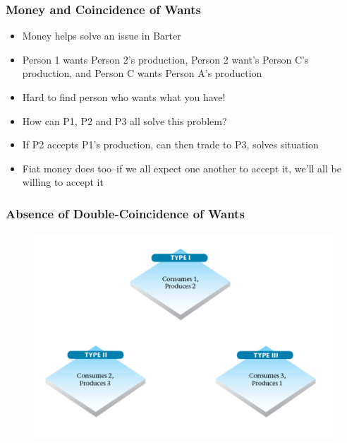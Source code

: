 \documentclass{beamer}
\begin{document}
\begin{frame}
\frametitle[alignment=center]{Money and Coincidence of Wants}
\begin{itemize}
\item Money helps solve an issue in Barter
\bigskip
\item Person 1 wants Person 2's production, Person 2 want's Person C's production, and Person C wants Person A's production
\bigskip
\item Hard to find person who wants what you have!
\bigskip
\item How can P1, P2 and P3 all solve this problem?
\bigskip
\item If P2 accepts P1's production, can then trade to P3, solves situation
\bigskip
\item Fiat money does too--if we all expect one another to accept it, we'll all be willing to accept it
\end{itemize}
\end{frame}

\begin{frame}
\frametitle[alignment=center]{Absence of Double-Coincidence of Wants}
\begin{figure}
\centering
\includegraphics[scale=0.6]{Figures/W_Fig_18pt1.png}
\end{figure}
\end{frame}
\end{document}
